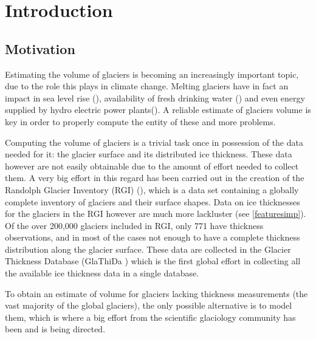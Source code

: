 \chapter{Introduction}\label{chap1}
\thispagestyle{plain}

\section{Motivation}\label{motivation}
Estimating the volume of glaciers is becoming an increasingly important topic, due to the role this plays in climate change. Melting glaciers have in fact an impact in sea level rise (\citet{Zemp2017}), availability of fresh drinking water (\citet{Kaser2010}) and even energy supplied by hydro electric power plants(\citet{Terrier2011}). A reliable estimate of glaciers volume is key in order to properly compute the entity of these and more problems.

Computing the volume of glaciers is a trivial task once in possession of the data needed for it: the glacier surface and its distributed ice thickness. These data however are not easily obtainable due to the amount of effort needed to collect them. A very big effort in this regard has been carried out in the creation of the Randolph Glacier Inventory (RGI) (\citet{RGI2014}), which is a data set containing a globally complete inventory of glaciers and their surface shapes. Data on ice thicknesses for the glaciers in the RGI however are much more lackluster (see \ref{featuresimp}). Of the over 200,000 glaciers included in RGI, only 771 have thickness observations, and in most of the cases not enough to have a complete thickness distribution along the glacier surface. These data are collected in the Glacier Thickness Database (GlaThiDa \citet{GlaThiDa2014}) which is the first global effort in collecting all the available ice thickness data in a single database.

To obtain an estimate of volume for glaciers lacking thickness measurements (the vast majority of the global glaciers), the only possible alternative is to model them, which is where a big effort from the scientific glaciology community has been and is being directed.
  


